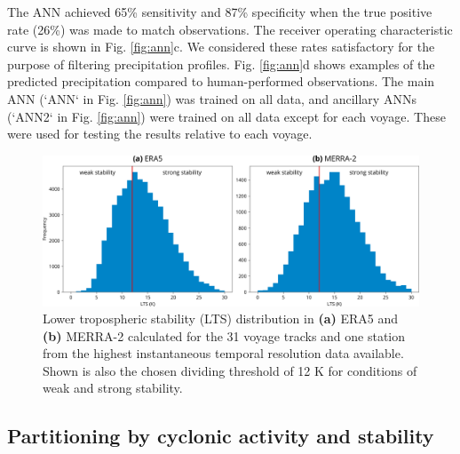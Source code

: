 \documentclass[draft]{agujournal2019}
\begin{document}
The ANN achieved 65\% sensitivity and 87\% specificity when the true positive rate (26\%) was made to match observations. The receiver operating characteristic curve is shown in Fig. \ref{fig:ann}c. We considered these rates satisfactory for the purpose of filtering precipitation profiles. Fig. \ref{fig:ann}d shows examples of the predicted precipitation compared to human-performed observations. The main ANN (`ANN` in Fig. \ref{fig:ann}) was trained on all data, and ancillary ANNs (`ANN2` in Fig. \ref{fig:ann}) were trained on all data except for each voyage. These were used for testing the results relative to each voyage.

\begin{figure}[b!]
\centering
\includegraphics[width=\textwidth]{img/lts_dist.pdf}
\caption{
Lower tropospheric stability (LTS) distribution in \textbf{(a)} ERA5 and \textbf{(b)} MERRA-2 calculated for the 31 voyage tracks and one station from the highest instantaneous temporal resolution data available. Shown is also the chosen dividing threshold of 12 K for conditions of weak and strong stability.
}
\label{fig:lts}
\end{figure}

\subsection{Partitioning by cyclonic activity and stability}
\label{sec:cyclone-stability}
\end{document}
